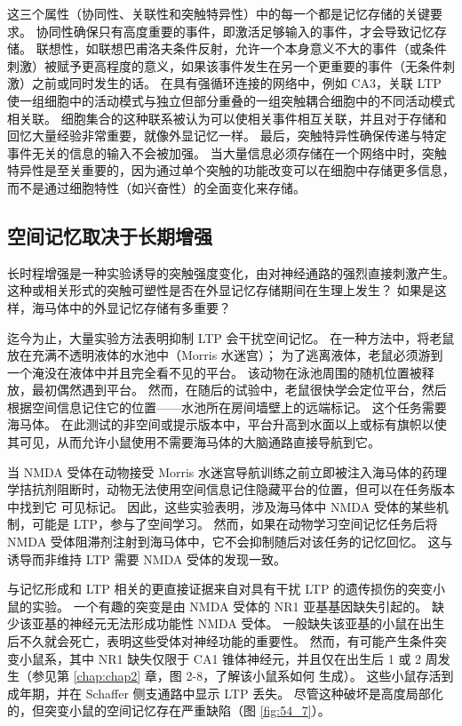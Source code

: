 这三个属性（协同性、关联性和突触特异性）中的每一个都是记忆存储的关键要求。
协同性确保只有高度重要的事件，即激活足够输入的事件，才会导致记忆存储。
联想性，如联想巴甫洛夫条件反射，允许一个本身意义不大的事件（或条件刺激）被赋予更高程度的意义，如果该事件发生在另一个更重要的事件（无条件刺激）之前或同时发生的话。
在具有强循环连接的网络中，例如 CA3，关联 LTP 使一组细胞中的活动模式与独立但部分重叠的一组突触耦合细胞中的不同活动模式相关联。
细胞集合的这种联系被认为可以使相关事件相互关联，并且对于存储和回忆大量经验非常重要，就像外显记忆一样。
最后，突触特异性确保传递与特定事件无关的信息的输入不会被加强。
当大量信息必须存储在一个网络中时，突触特异性是至关重要的，因为通过单个突触的功能改变可以在细胞中存储更多信息，而不是通过细胞特性（如兴奋性）的全面变化来存储。



\subsection{空间记忆取决于长期增强}

长时程增强是一种实验诱导的突触强度变化，由对神经通路的强烈直接刺激产生。
这种或相关形式的突触可塑性是否在外显记忆存储期间在生理上发生？
如果是这样，海马体中的外显记忆存储有多重要？


迄今为止，大量实验方法表明抑制 LTP 会干扰空间记忆。
在一种方法中，将老鼠放在充满不透明液体的水池中（Morris 水迷宫）；
为了逃离液体，老鼠必须游到一个淹没在液体中并且完全看不见的平台。
该动物在泳池周围的随机位置被释放，最初偶然遇到平台。
然而，在随后的试验中，老鼠很快学会定位平台，然后根据空间信息记住它的位置——水池所在房间墙壁上的远端标记。
这个任务需要海马体。
在此测试的非空间或提示版本中，平台升高到水面以上或标有旗帜以使其可见，从而允许小鼠使用不需要海马体的大脑通路直接导航到它。


当 NMDA 受体在动物接受 Morris 水迷宫导航训练之前立即被注入海马体的药理学拮抗剂阻断时，动物无法使用空间信息记住隐藏平台的位置，但可以在任务版本中找到它 可见标记。
因此，这些实验表明，涉及海马体中 NMDA 受体的某些机制，可能是 LTP，参与了空间学习。
然而，如果在动物学习空间记忆任务后将 NMDA 受体阻滞剂注射到海马体中，它不会抑制随后对该任务的记忆回忆。
这与诱导而非维持 LTP 需要 NMDA 受体的发现一致。


与记忆形成和 LTP 相关的更直接证据来自对具有干扰 LTP 的遗传损伤的突变小鼠的实验。
一个有趣的突变是由 NMDA 受体的 NR1 亚基基因缺失引起的。
缺少该亚基的神经元无法形成功能性 NMDA 受体。
一般缺失该亚基的小鼠在出生后不久就会死亡，表明这些受体对神经功能的重要性。
然而，有可能产生条件突变小鼠系，其中 NR1 缺失仅限于 CA1 锥体神经元，并且仅在出生后 1 或 2 周发生（参见第 \ref{chap:chap2} 章，图 2-8，了解该小鼠系如何 生成）。
这些小鼠存活到成年期，并在 Schaffer 侧支通路中显示 LTP 丢失。
尽管这种破坏是高度局部化的，但突变小鼠的空间记忆存在严重缺陷（图 \ref{fig:54_7}）。


